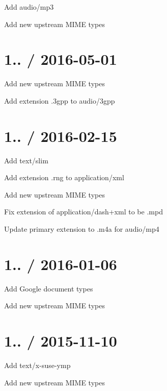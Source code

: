 \begin{DoxyItemize}
\item Add {\ttfamily audio/mp3}
\item Add new upstream M\+I\+ME types
\end{DoxyItemize}

\section*{1.. / 2016-\/05-\/01 }


\begin{DoxyItemize}
\item Add new upstream M\+I\+ME types
\item Add extension {\ttfamily .3gpp} to {\ttfamily audio/3gpp}
\end{DoxyItemize}

\section*{1.. / 2016-\/02-\/15 }


\begin{DoxyItemize}
\item Add {\ttfamily text/slim}
\item Add extension {\ttfamily .rng} to {\ttfamily application/xml}
\item Add new upstream M\+I\+ME types
\item Fix extension of {\ttfamily application/dash+xml} to be {\ttfamily .mpd}
\item Update primary extension to {\ttfamily .m4a} for {\ttfamily audio/mp4}
\end{DoxyItemize}

\section*{1.. / 2016-\/01-\/06 }


\begin{DoxyItemize}
\item Add Google document types
\item Add new upstream M\+I\+ME types
\end{DoxyItemize}

\section*{1.. / 2015-\/11-\/10 }


\begin{DoxyItemize}
\item Add {\ttfamily text/x-\/suse-\/ymp}
\item Add new upstream M\+I\+ME types
\end{DoxyItemize}

